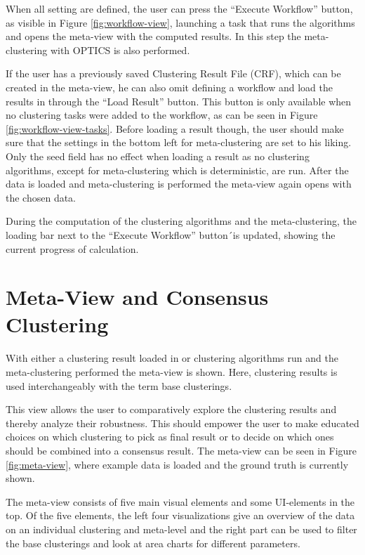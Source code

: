 \documentclass[
	a4paper,
	english,
	twoside,
	openright,               
	11pt                            
	]{report}
\begin{document}
When all setting are defined, the user can press the ``Execute Workflow'' button, as visible in Figure \ref{fig:workflow-view}, launching a task that runs the algorithms and opens the meta-view with the computed results. In this step the meta-clustering with OPTICS \cite{10.1145/304181.304187} is also performed.

If the user has a previously saved Clustering Result File (CRF), which can be created in the meta-view, he can also omit defining a workflow and load the results in through the ``Load Result'' button. This button is only available when no clustering tasks were added to the workflow, as can be seen in Figure \ref{fig:workflow-view-tasks}. Before loading a result though, the user should make sure that the settings in the bottom left for meta-clustering are set to his liking. Only the seed field has no effect when loading a result as no clustering algorithms, except for meta-clustering which is deterministic, are run. After the data is loaded and meta-clustering is performed the meta-view again opens with the chosen data.

During the computation of the clustering algorithms and the meta-clustering, the loading bar next to the ``Execute Workflow'' button´is updated, showing the current progress of calculation.

\section{Meta-View and Consensus Clustering}
With either a clustering result loaded in or clustering algorithms run and the meta-clustering performed the meta-view is shown. Here, clustering results is used interchangeably with the term base clusterings.

This view allows the user to comparatively explore the clustering results and thereby analyze their robustness. This should empower the user to make educated choices on which clustering to pick as final result or to decide on which ones should be combined into a consensus result. The meta-view can be seen in Figure \ref{fig:meta-view}, where example data is loaded and the ground truth is currently shown.

The meta-view consists of five main visual elements and some UI-elements in the top. Of the five elements, the left four visualizations give an overview of the data on an individual clustering and meta-level and the right part can be used to filter the base clusterings and look at area charts for different parameters. 
\end{document}
